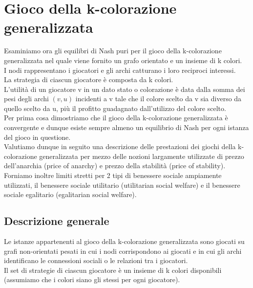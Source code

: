 \chapter{Gioco della k-colorazione generalizzata}
\justify
Esaminiamo ora gli equilibri di Nash puri per il gioco della k-colorazione generalizzata nel quale viene fornito un grafo orientato e un insieme di k colori.\\

I nodi rappresentano i giocatori e gli archi catturano i loro reciproci interessi.\\

La strategia di ciascun giocatore è composta da k colori.\\

L'utilità di un giocatore v in un dato stato o colorazione è data dalla somma dei pesi degli archi \((v, u)\) incidenti a v tale che il colore scelto da v sia diverso da quello scelto da u, più il profitto guadagnato dall'utilizzo del colore scelto.\\

Per prima cosa dimostriamo che il gioco della k-colorazione generalizzata è convergente e dunque esiste sempre almeno un equilibrio di Nash per ogni istanza del gioco in questione.\\

Valutiamo dunque in seguito una descrizione delle prestazioni dei giochi della k-colorazione generalizzata per mezzo delle nozioni largamente utilizzate di prezzo dell'anarchia (price of anarchy) e prezzo della stabilità (price of stability).\\

Forniamo inoltre limiti stretti per 2 tipi di benessere sociale ampiamente utilizzati, il benessere sociale utilitario (utilitarian social welfare) e il benessere sociale egalitario (egalitarian social welfare).\\

\section{Descrizione generale}
\justify
Le istanze appartenenti al gioco della k-colorazione generalizzata sono giocati su grafi non-orientati pesati in cui i nodi corrispondono ai giocati e in cui gli archi identificano le connessioni sociali o le relazioni tra i giocatori.\\

Il set di strategie di ciascun giocatore è un insieme di k colori disponibili (assumiamo che i colori siano gli stessi per ogni giocatore).\\

